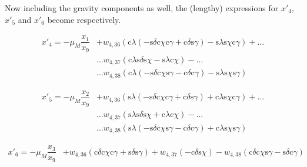 \noindent
Now including the gravity components as well, the (lengthy) expressions for $x'_{4}$, $x'_{5}$ and $x'_{6}$ become  respectively.

\begin{equation} \label{eq:u4Com}
\begin{split}
x'_{4}= -\mu_{M}\dfrac{x_{1}}{x_{9}}&+w_{4,36}\left( \text{c}\lambda\left(-\text{s}\delta \text{c}\chi \text{c}\gamma +\text{c}\delta \text{s}\gamma \right)-\text{s}\lambda \text{s}\chi \text{c}\gamma \right)+ \dots \\
& \dotsc  w_{4,37} \left( \text{c}\lambda \text{s}\delta \text{s}\chi -\text{s}\lambda \text{c}\chi\right)-\dots \\
& \dotsc w_{4,38} \left( \text{c}\lambda\left(-\text{s}\delta \text{c}\chi \text{s}\gamma -\text{c}\delta \text{c}\gamma \right)-\text{s}\lambda \text{s}\chi \text{s}\gamma \right)
\end{split}
\end{equation}

\begin{equation} \label{eq:u5Com}
\begin{split}
x'_{5}= -\mu_{M}\dfrac{x_{2}}{x_{9}}&+w_{4,36} \left( \text{s}\lambda\left(-\text{s}\delta \text{c}\chi \text{c}\gamma +\text{c}\delta \text{s}\gamma \right)+\text{c}\lambda \text{s}\chi \text{c}\gamma \right)+ \dots \\
& \dotsc w_{4,37} \left( \text{s}\lambda \text{s}\delta \text{s}\chi +\text{c}\lambda \text{c}\chi \right) - \dots \\
& \dotsc w_{4,38} \left( \text{s}\lambda\left(-\text{s}\delta \text{c}\chi \text{s}\gamma -\text{c}\delta \text{c}\gamma \right)+\text{c}\lambda \text{s}\chi \text{s}\gamma \right)
\end{split}
\end{equation} 

\begin{equation} \label{eq:u6Com}
\begin{split}
x'_{6}= -\mu_{M}\dfrac{x_{3}}{x_{9}}&+w_{4,36} \left( \text{c}\delta \text{c}\chi \text{c}\gamma +\text{s}\delta \text{s}\gamma\right) +  w_{4,37} \left(  -\text{c}\delta \text{s}\chi \right)  -w_{4,38} \left(  \text{c}\delta \text{c}\chi \text{s}\gamma -\text{s}\delta \text{c}\gamma \right)
\end{split}
\end{equation}

